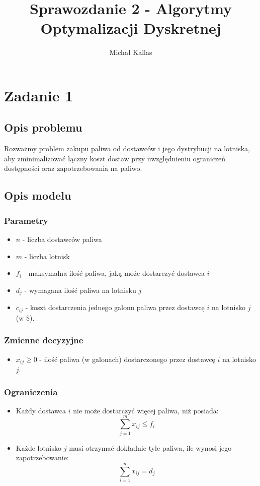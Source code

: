 \documentclass{article}
\title{Sprawozdanie 2 - Algorytmy Optymalizacji Dyskretnej}
\author{Michał Kallas}
\begin{document}
\maketitle

\section{Zadanie 1}
\subsection{Opis problemu}

Rozważmy problem zakupu paliwa od dostawców i jego dystrybucji na lotniska, aby zminimalizować łączny koszt dostaw przy uwzględnieniu ograniczeń dostępności oraz zapotrzebowania na paliwo.

\subsection{Opis modelu}
\subsubsection{Parametry}
\begin{itemize}
    \item $n$ - liczba dostawców paliwa
    \item $m$ - liczba lotnisk
    \item $f_i$ - maksymalna ilość paliwa, jaką może dostarczyć dostawca $i$
    \item $d_j$ - wymagana ilość paliwa na lotnisku $j$
    \item $c_{ij}$ - koszt dostarczenia jednego galonu paliwa przez dostawcę $i$ na lotnisko $j$ (w \$).
\end{itemize}

\subsubsection{Zmienne decyzyjne}
\begin{itemize}
    \item $x_{ij} \geq 0$ - ilość paliwa (w galonach) dostarczonego przez dostawcę $i$ na lotnisko $j$.
\end{itemize}

\subsubsection{Ograniczenia}
\begin{itemize}
    \item Każdy dostawca $i$ nie może dostarczyć więcej paliwa, niż posiada:
    \[
    \sum_{j=1}^{m} x_{ij} \leq f_i
    \]
    \item Każde lotnisko $j$ musi otrzymać dokładnie tyle paliwa, ile wynosi jego zapotrzebowanie:
    \[
    \sum_{i=1}^{n} x_{ij} = d_j
    \]
\end{itemize}
\end{document}
